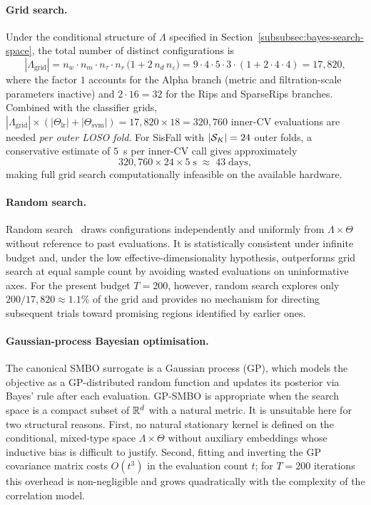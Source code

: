 \paragraph{Grid search.}
Under the conditional structure of $\Lambda$ specified in
Section~\ref{subsubsec:bayes-search-space}, the total number of distinct
configurations is
\begin{equation}
  |\Lambda_{\mathrm{grid}}|
  = n_w\cdot n_m\cdot n_\tau\cdot n_r\,
    \bigl(1 + 2\,n_d\,n_\varepsilon\bigr)
  = 9\cdot 4\cdot 5\cdot 3\cdot(1+2\cdot 4\cdot 4)
  = 17{,}820,
  \label{eq:grid-count}
\end{equation}
where the factor $1$ accounts for the Alpha branch (metric and filtration-scale parameters
inactive) and $2\cdot 16=32$ for the Rips and SparseRips branches. Combined with the
classifier grids, $|\Lambda_{\mathrm{grid}}|\times(|\Theta_{\mathrm{lr}}|+|\Theta_{\mathrm{svm}}|)
= 17{,}820\times 18 = 320{,}760$ inner-CV evaluations are needed \emph{per outer LOSO fold}.
For SisFall with $|\mathcal{S}_K|=24$ outer folds, a conservative estimate of $5$~s per inner-CV
call gives approximately
\[
  320{,}760\times 24\times 5\;\mathrm{s}\;\approx\;43\;\text{days},
\]
making full grid search computationally infeasible on the available hardware.

\paragraph{Random search.}
Random search~\parencite{bergstra2012random} draws configurations independently and uniformly
from $\Lambda\times\Theta$ without reference to past evaluations. It is
statistically consistent under infinite budget and, under the low effective-dimensionality
hypothesis, outperforms grid search at equal sample count by avoiding wasted evaluations
on uninformative axes. For the present budget $T=200$, however, random search explores
only $200/17{,}820\approx 1.1\%$ of the grid and provides no mechanism for directing
subsequent trials toward promising regions identified by earlier ones.

\paragraph{Gaussian-process Bayesian optimisation.}
The canonical SMBO surrogate is a Gaussian process (GP), which models the objective as a
GP-distributed random function and updates its posterior via Bayes' rule after each
evaluation. GP-SMBO is appropriate when the search space is a compact subset of $\mathbb{R}^d$
with a natural metric. It is unsuitable here for two structural reasons. First, no natural
stationary kernel is defined on the conditional, mixed-type space $\Lambda\times\Theta$
without auxiliary embeddings whose inductive bias is difficult to justify. Second, fitting
and inverting the GP covariance matrix costs $O(t^3)$ in the evaluation count $t$; for
$T=200$ iterations this overhead is non-negligible and grows quadratically with the
complexity of the correlation model.

